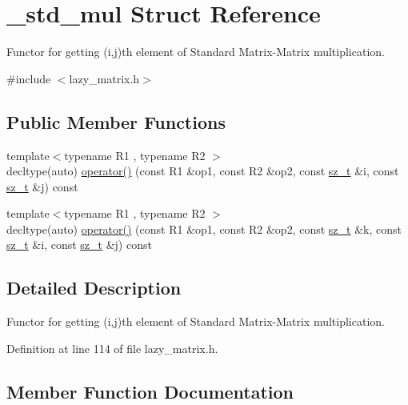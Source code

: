 \hypertarget{struct__std__mul}{}\section{\+\_\+std\+\_\+mul Struct Reference}
\label{struct__std__mul}


Functor for getting (i,j)th element of Standard Matrix-\/\+Matrix multiplication.  




{\ttfamily \#include $<$lazy\+\_\+matrix.\+h$>$}

\subsection*{Public Member Functions}
\begin{DoxyCompactItemize}
\item 
{\footnotesize template$<$typename R1 , typename R2 $>$ }\\decltype(auto) \mbox{\hyperlink{struct__std__mul_ac151a60a20f2c5fb6fb48abb24926ab3}{operator()}} (const R1 \&op1, const R2 \&op2, const \mbox{\hyperlink{lazy__matrix_8h_acba2745dcfc55b2d05ff45adc6a0a015}{sz\+\_\+t}} \&i, const \mbox{\hyperlink{lazy__matrix_8h_acba2745dcfc55b2d05ff45adc6a0a015}{sz\+\_\+t}} \&j) const
\item 
{\footnotesize template$<$typename R1 , typename R2 $>$ }\\decltype(auto) \mbox{\hyperlink{struct__std__mul_a7042dcb453b74c4e3fa1c70179c38043}{operator()}} (const R1 \&op1, const R2 \&op2, const \mbox{\hyperlink{lazy__matrix_8h_acba2745dcfc55b2d05ff45adc6a0a015}{sz\+\_\+t}} \&k, const \mbox{\hyperlink{lazy__matrix_8h_acba2745dcfc55b2d05ff45adc6a0a015}{sz\+\_\+t}} \&i, const \mbox{\hyperlink{lazy__matrix_8h_acba2745dcfc55b2d05ff45adc6a0a015}{sz\+\_\+t}} \&j) const
\end{DoxyCompactItemize}


\subsection{Detailed Description}
Functor for getting (i,j)th element of Standard Matrix-\/\+Matrix multiplication. 

Definition at line 114 of file lazy\+\_\+matrix.\+h.



\subsection{Member Function Documentation}
\mbox{\label{struct__std__mul_ac151a60a20f2c5fb6fb48abb24926ab3}} 
